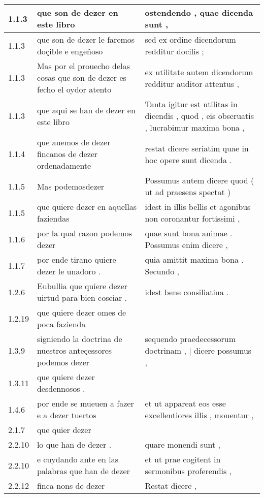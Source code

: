 \begin{tabular}{|p{1cm}|p{6.5cm}|p{6.5cm}|}

\hline
1.1.3 & que son de dezer en este libro & ostendendo , quae dicenda sunt , \\\hline
1.1.3 & que son de dezer le faremos doçible e engeñoso & sed ex ordine dicendorum redditur docilis ; \\\hline
1.1.3 & Mas por el prouecho delas cosas que son de dezer es fecho el oydor atento & ex utilitate autem dicendorum redditur auditor attentus , \\\hline
1.1.3 & que aqui se han de dezer en este libro & Tanta igitur est utilitas in dicendis , quod , eis obseruatis , lucrabimur maxima bona , \\\hline
1.1.4 & que auemos de dezer fincanos de dezer ordenadamente & restat dicere seriatim quae in hoc opere sunt dicenda . \\\hline
1.1.5 & Mas podemosdezer & Possumus autem dicere quod ( ut ad praesens spectat ) \\\hline
1.1.5 & que quiere dezer en aquellas faziendas & idest in illis bellis et agonibus non coronantur fortissimi , \\\hline
1.1.6 & por la qual razon podemos dezer & quae sunt bona animae . Possumus enim dicere , \\\hline
1.1.7 & por ende tirano quiere dezer le unadoro . & quia amittit maxima bona . Secundo , \\\hline
1.2.6 & Eubullia que quiere dezer uirtud para bien coseiar . & idest bene consiliatiua . \\\hline
1.2.19 & que quiere dezer omes de poca fazienda &  \\\hline
1.3.9 & signiendo la doctrina de nuestros anteçessores podemos dezer & sequendo praedecessorum doctrinam , | dicere possumus , \\\hline
1.3.11 & que quiere dezer desdennosos . &  \\\hline
1.4.6 & por ende se mueuen a fazer e a dezer tuertos & et ut appareat eos esse excellentiores illis , mouentur , \\\hline
2.1.7 & que quier dezer &  \\\hline
2.2.10 & lo que han de dezer . & quare monendi sunt , \\\hline
2.2.10 & e cuydando ante en las palabras que han de dezer & et ut prae cogitent in sermonibus proferendis , \\\hline
2.2.12 & finca nons de dezer & Restat dicere , \\\hline

\end{tabular}
